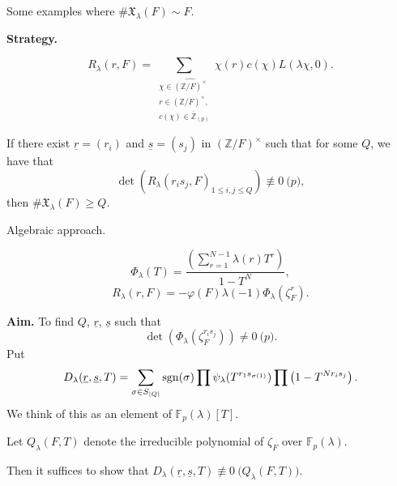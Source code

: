 \documentclass[reqno]{amsart} 
\begin{document}
\begin{remark}
  Some examples where $\# \mathfrak{X}_\lambda(F) \sim F$.
\end{remark}

\textbf{Strategy.}

\begin{equation*}
  R_\lambda(r, F) = \sum_{
    \substack{
      \chi \in \widehat{(\mathbb{Z} / F)^\times }  \\
      r \in(\mathbb{Z} / F)^\times, \\
      c(\chi) \in \overline{\mathbb{Z} }_{(p)}
    }
  }
  \chi(r) c(\chi ) L(\lambda \chi, 0).
\end{equation*}

\begin{fact}
  If there exist $\underline{r} =(r_i )$ and $\underline{s} =(s_j )$ in $(\mathbb{Z} / F)^\times$ such that for some $Q$, we have that
  \begin{equation*}
    \det \left( R_\lambda(r_i s_j , F) _{ 1 \leq i, j \leq Q} \right) \not \equiv 0 \pod{p},
  \end{equation*}
  then $\# \mathfrak{X}_\lambda(F) \geq Q$.
\end{fact}

Algebraic approach.

\begin{equation*}
  \Phi_\lambda(T) =
  \frac{\left(
    \sum_{r = 1 }^{N - 1}
  \lambda(r) T^r \right)}{1 - T^N},
\end{equation*}
\begin{equation*}
R_\lambda(r, F) = - \varphi(F) \lambda(- 1) \Phi_\lambda(\zeta_F^r).
\end{equation*}

\textbf{Aim.}  To find $Q$, $\underline{r}$, $\underline{s}$ such that
\begin{equation*}
  \det \left( \Phi_\lambda(\zeta_F^{r_i s_j }) \right) \neq 0 \pod{p}.
\end{equation*}
Put
\begin{equation*}
  D_\lambda(\underline{r}, \underline{s}, T)
  = \sum_{\sigma \in S_{\lvert Q \rvert}}
  \operatorname{sgn}(\sigma) \prod \psi_\lambda(T^{r_1 s_{\sigma(1)}})
  \prod \left( 1 - T^{N r_i s_j} \right).
\end{equation*}
We think of this as an element of $\mathbb{F}_p(\lambda) [T]$.

Let $Q_\lambda(F, T)$ denote the irreducible polynomial of $\zeta_F$ over $\mathbb{F}_p(\lambda)$.

Then it suffices to show that $D_\lambda(\underline{r}, \underline{s}, T) \not \equiv 0 \pod{Q_\lambda(F, T)}$.
\end{document}
